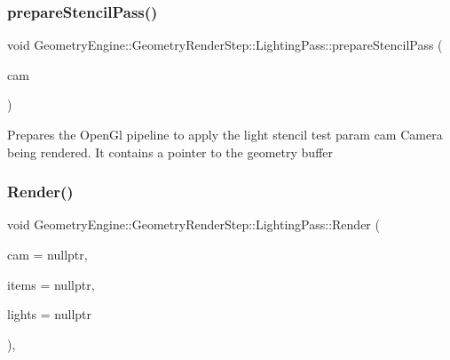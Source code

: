 \subsubsection{\texorpdfstring{prepareStencilPass()}{prepareStencilPass()}}
{\footnotesize\ttfamily void Geometry\+Engine\+::\+Geometry\+Render\+Step\+::\+Lighting\+Pass\+::prepare\+Stencil\+Pass (\begin{DoxyParamCaption}\item[{\mbox{\hyperlink{class_geometry_engine_1_1_geometry_world_item_1_1_geometry_camera_1_1_camera}{Geometry\+World\+Item\+::\+Geometry\+Camera\+::\+Camera}} $\ast$}]{cam }\end{DoxyParamCaption})\hspace{0.3cm}{\ttfamily [protected]}}

Prepares the Open\+Gl pipeline to apply the light stencil test param cam Camera being rendered. It contains a pointer to the geometry buffer \mbox{\label{class_geometry_engine_1_1_geometry_render_step_1_1_lighting_pass_ae6d9fa99f67e659839ca310947787f52}} 
\subsubsection{\texorpdfstring{Render()}{Render()}}
{\footnotesize\ttfamily void Geometry\+Engine\+::\+Geometry\+Render\+Step\+::\+Lighting\+Pass\+::\+Render (\begin{DoxyParamCaption}\item[{\mbox{\hyperlink{class_geometry_engine_1_1_geometry_world_item_1_1_geometry_camera_1_1_camera}{Geometry\+World\+Item\+::\+Geometry\+Camera\+::\+Camera}} $\ast$}]{cam = {\ttfamily nullptr},  }\item[{std\+::unordered\+\_\+set$<$ \mbox{\hyperlink{class_geometry_engine_1_1_geometry_world_item_1_1_geometry_item_1_1_geometry_item}{Geometry\+World\+Item\+::\+Geometry\+Item\+::\+Geometry\+Item}} $\ast$ $>$ $\ast$}]{items = {\ttfamily nullptr},  }\item[{std\+::unordered\+\_\+set$<$ \mbox{\hyperlink{class_geometry_engine_1_1_geometry_world_item_1_1_geometry_light_1_1_light}{Geometry\+World\+Item\+::\+Geometry\+Light\+::\+Light}} $\ast$ $>$ $\ast$}]{lights = {\ttfamily nullptr} }\end{DoxyParamCaption})\hspace{0.3cm}{\ttfamily [override]}, {\ttfamily [virtual]}}

